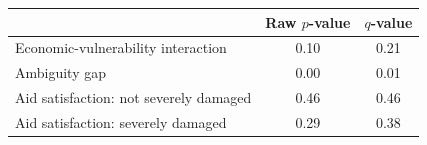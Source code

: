 \begin{tabular}{l*{2}{c}}
\toprule
            &Raw \(p\)-value& \(q\)-value\\
\midrule
Economic-vulnerability interaction&        0.10&        0.21\\
Ambiguity gap&        0.00&        0.01\\
Aid satisfaction: not severely damaged&        0.46&        0.46\\
Aid satisfaction: severely damaged&        0.29&        0.38\\
\bottomrule
\end{tabular}
